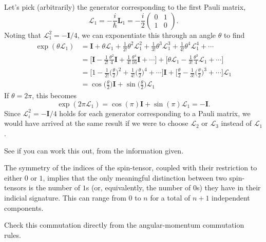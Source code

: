 \documentclass[../road-to-reality.tex]{subfiles}
\begin{document}
\begin{questions}
\begin{solution}
	Let's pick (arbitrarily) the generator corresponding to the first Pauli matrix,
	\[
		\mathcal{L}_1 = -\frac{i}{\hbar}\mathbf{L}_1 = -\frac{i}{2}\begin{pmatrix}0 & 1 \\ 1 & 0\end{pmatrix}.
	\]
	Noting that $\mathcal{L}_1^2 = -\mathbf{I}/4$, we can exponentiate this through an angle $\theta$ to find
	\begin{align*}
		\exp(\theta\mathcal{L}_1) &= \mathbf{I} + \theta\mathcal{L}_1 + \frac{1}{2!}\theta^2\mathcal{L}_1^2 + \frac{1}{3!}\theta^3\mathcal{L}_1^3 + \frac{1}{4!}\theta^4\mathcal{L}_1^4 + \cdots \\
		&= \Big[\mathbf{I} - \frac{1}{2!}\frac{\theta^2}{4}\mathbf{I} + \frac{1}{4!}\frac{\theta^4}{16}\mathbf{I} + \cdots\Big] + \Big[\theta\mathcal{L}_1 - \frac{1}{3!}\frac{\theta^3}{4}\mathcal{L}_1 + \cdots\Big] \\
		&= \Big[1 - \frac{1}{2!}\Big(\frac{\theta}{2}\Big)^2 + \frac{1}{4!}\Big(\frac{\theta}{2}\Big)^4 + \cdots\Big]\mathbf{I} + \Big[\frac{\theta}{2} - \frac{1}{3!}\Big(\frac{\theta}{2}\Big)^3 + \cdots\Big]\mathcal{L}_1 \\
		&= \cos\Big(\frac{\theta}{2}\Big)\mathbf{I} + \sin\Big(\frac{\theta}{2}\Big)\mathcal{L}_1
	\end{align*}
	If $\theta=2\pi$, this becomes
	\[
		\exp(2\pi\mathcal{L}_1) = \cos(\pi)\mathbf{I} + \sin(\pi)\mathcal{L}_1 = -\mathbf{I}.
	\]
	Since $\mathcal{L}_i^2 = -\mathbf{I}/4$ holds for each generator corresponding to a Pauli matrix, we would have arrived at the same result if we were to choose $\mathcal{L}_2$ or $\mathcal{L}_3$ instead of $\mathcal{L}_1$.
\end{solution}

\question See if you can work this out, from the information given.

\begin{solution}
	The symmetry of the indices of the spin-tensor, coupled with their restriction to either $0$ or $1$, implies that the only meaningful distinction between two spin-tensors is the number of $1$s (or, equivalently, the number of $0$s) they have in their indicial signature. This can range from $0$ to $n$ for a total of $n+1$ independent components.
\end{solution}

\question Check this commutation directly from the angular-momentum commutation rules.


\end{questions}
\end{document}
